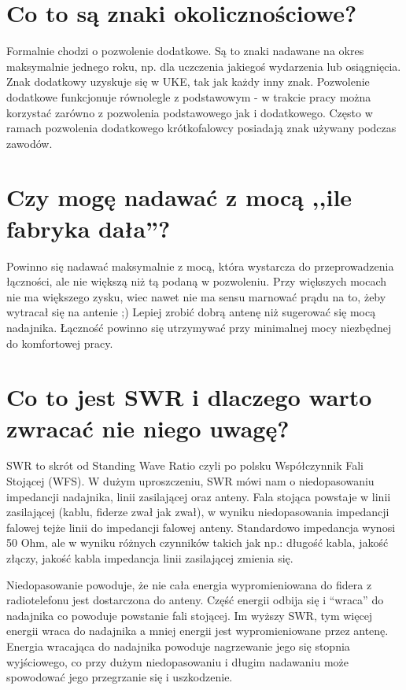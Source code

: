 \documentclass[a4paper,12pt]{article}
\begin{document}
\section{Co to są znaki okolicznościowe?}
Formalnie chodzi o pozwolenie dodatkowe. Są to znaki nadawane na okres maksymalnie jednego roku, np. dla uczczenia jakiegoś wydarzenia lub osiągnięcia. Znak dodatkowy uzyskuje się w UKE, tak jak każdy inny znak. Pozwolenie dodatkowe funkcjonuje równolegle z podstawowym - w trakcie pracy można korzystać zarówno z pozwolenia podstawowego jak i dodatkowego. Często w ramach pozwolenia dodatkowego krótkofalowcy posiadają znak używany podczas zawodów. 

\section{Czy mogę nadawać z mocą ,,ile fabryka dała''?}
Powinno się nadawać maksymalnie z mocą, która wystarcza do przeprowadzenia łączności, ale nie większą niż tą podaną w pozwoleniu. Przy większych mocach nie ma większego zysku, wiec nawet nie ma sensu marnować prądu na to, żeby wytracał się na antenie ;) Lepiej zrobić dobrą antenę niż sugerować się mocą nadajnika.
Łączność powinno się utrzymywać przy minimalnej mocy niezbędnej do komfortowej pracy. 

\section{Co to jest SWR i dlaczego warto zwracać nie niego uwagę?}
SWR to skrót od Standing Wave Ratio czyli po polsku Współczynnik Fali Stojącej (WFS). W dużym uproszczeniu, SWR mówi nam o niedopasowaniu impedancji nadajnika, linii zasilającej oraz anteny. Fala stojąca powstaje w linii zasilającej (kablu, fiderze zwał jak zwał), w wyniku niedopasowania impedancji falowej tejże linii do impedancji falowej anteny. Standardowo impedancja wynosi 50 Ohm, ale w wyniku różnych czynników takich jak np.: długość kabla, jakość złączy, jakość kabla impedancja linii zasilającej zmienia się. 

Niedopasowanie powoduje, że nie cała energia wypromieniowana do fidera z radiotelefonu jest dostarczona do anteny. Część energii odbija się i “wraca” do nadajnika co powoduje powstanie fali stojącej. Im wyższy SWR, tym więcej energii wraca do nadajnika a mniej energii jest wypromieniowane przez antenę. Energia wracająca do nadajnika powoduje nagrzewanie jego się stopnia wyjściowego, co przy dużym niedopasowaniu i długim nadawaniu może spowodować jego przegrzanie się i uszkodzenie.
\end{document}
